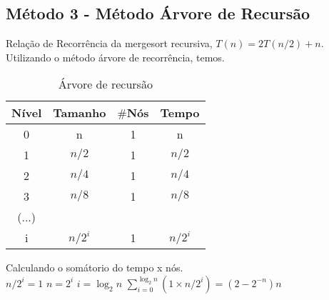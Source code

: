 \subsection{Método 3 - Método Árvore de Recursão}
Relação de Recorrência da mergesort recursiva, $T(n) = 2T(n/2) + n$. Utilizando o método árvore de recorrência, temos.

\begin{table}[ht!]
    \centering
    \begin{tabular}{|c|c|c|c|}
    \hline
    \textbf{Nível} & \textbf{Tamanho} & $\#$\textbf{Nós} & \textbf{Tempo} \\ \hline
     0 & n & 1 & n \\ \hline
     1 & $n/2$ & 1 & $n/2$ \\ \hline
     2 & $n/4$ & 1 & $n/4$ \\ \hline
     3 & $n/8$ & 1 & $n/8$ \\ \hline
     (...) & & & \\ \hline
     i & $n/2^i$ & 1 & $n/2^i$ \\ \hline 
    \end{tabular}  
    \caption{Árvore de recursão}
\end{table}

Calculando o somátorio do tempo x nós. \\
$n/2^i = 1$ \rightarrow $n = 2^i$ \rightarrow $i = \log_2{n}$
$\sum_{i=0}^{\log_2{n}} (1 \times n/2^i) = (2 - 2^{-n})n$